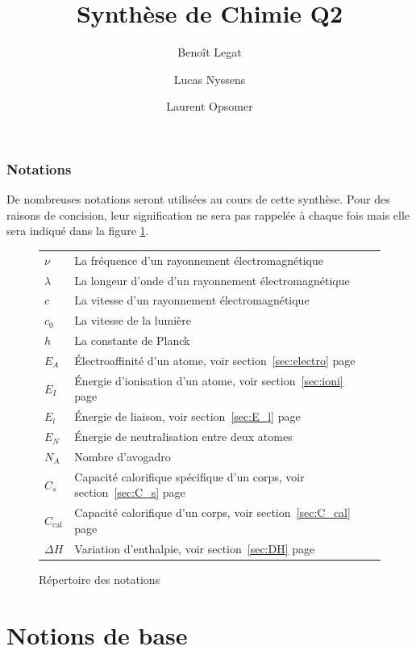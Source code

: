 \documentclass[11pt,a4paper,french]{article}
\title{Synthèse de Chimie Q2}
\author{Benoît Legat \and Lucas Nyssens \and Laurent Opsomer}
\newcommand\ccal{C_\mathrm{cal}}
\begin{document}
\maketitle

\section{Notations}

De nombreuses notations seront utilisées au cours de cette synthèse.
Pour des raisons de concision, leur signification ne sera pas rappelée à chaque fois mais elle sera indiqué dans la figure \ref{fig:notations}.
\begin{figure}[h!]
	\begin{center}
		\begin{tabular}{ll}
			$\nu$ & La fréquence d'un rayonnement électromagnétique\\
			$\lambda$ & La longeur d'onde d'un rayonnement électromagnétique\\
			$c$ & La vitesse d'un rayonnement électromagnétique\\
			$c_0$ & La vitesse de la lumière\\
			$h$ & La constante de Planck\\
			$E_A$ & \'Electroaffinité d'un atome, voir section~\ref{sec:electro} page~\pageref{sec:electro}\\
			$E_I$ & \'Energie d'ionisation d'un atome, voir section~\ref{sec:ioni} page~\pageref{sec:ioni}\\
			$E_l$ & \'Energie de liaison, voir section~\ref{sec:E_l} page~\pageref{sec:E_l}\\ %
			$E_N$ & \'Energie de neutralisation entre deux atomes\\
			$N_A$ & Nombre d'avogadro\\
			$C_s$ & Capacité calorifique spécifique d'un corps, voir section~\ref{sec:C_s} page~\pageref{sec:C_s}\\
			$\ccal$ & Capacité calorifique d'un corps, voir section~\ref{sec:C_cal} page~\pageref{sec:C_cal}\\
			$\Delta H$ & Variation d'enthalpie, voir section~\ref{sec:DH} page~\pageref{sec:DH}
		\end{tabular}
		\label{fig:notations}
		\caption{Répertoire des notations}
	\end{center}
\end{figure}


\part{Notions de base}
\end{document}
